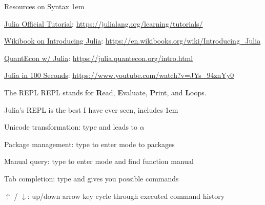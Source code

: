 \documentclass[11pt,aspectratio=43,usenames,dvipsnames]{beamer}
\newcommand{\blue}[1]{\textcolor{blue}{#1}}
\let\olditemize=\itemize
\let\endolditemize=\enditemize
\renewenvironment{itemize}{\olditemize \itemsep1em}{\endolditemize}
\theoremstyle{definition}
\begin{document}
\begin{frame}{Resources on Syntax}
\label{slide:Resources_on_Syntax}
    \begin{itemize}
        \item \blue{\href{https://docs.julialang.org/en/v1/manual/getting-started/}{Julia Official Tutorial}}: \tiny \url{https://julialang.org/learning/tutorials/}
        \normalsize
        \item \blue{\href{https://en.wikibooks.org/wiki/Introducing_Julia}{Wikibook on Introducing Julia}}: \tiny{\url{https://en.wikibooks.org/wiki/Introducing_Julia}}
        \normalsize
        \item \blue{\href{https://julia.quantecon.org/intro.html}{QuantEcon w/ Julia}}: \tiny{\url{https://julia.quantecon.org/intro.html}}
        \normalsize
        \item \blue{ \href{https://www.youtube.com/watch?v=JYs_94znYy0}{Julia in 100 Seconds}}: \tiny{\url{https://www.youtube.com/watch?v=JYs_94znYy0}}
    \end{itemize}
\end{frame}

\begin{frame}{The REPL}
\label{slide:The_REPL}
    REPL stands for \textbf{R}ead, \textbf{E}valuate, \textbf{P}rint, and \textbf{L}oops.

    Julia's REPL is the best I have ever seen, includes
    \begin{itemize}
        \item Unicode transformation: type \juliainline{\alpha} and  leads to $ \alpha $
        \item Package management: type \juliainline{]} to enter  mode to  packages
        \item Manual query: type  to enter  mode and find function manual
        \item Tab completion: type \juliainline{\al} and  gives you possible commands
        \item $ \uparrow  $ / $ \downarrow  $: up/down arrow key cycle through executed command history
    \end{itemize}

\end{frame}
\end{document}

